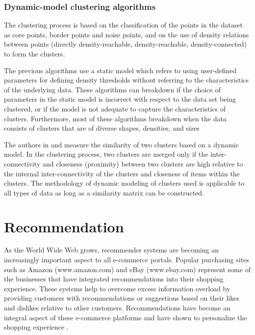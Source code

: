 \subsubsection{Dynamic-model clustering algorithms}
The clustering process is based on the classification of the points in the dataset as  core 
points,  border points and  noise points, and on the use of density relations between points 
(directly density-reachable,  density-reachable,  density-connected) to form the 
clusters. 

The previous algorithms use a static model which refers to using user-defined parameters for defining density thresholds without referring to the characteristics of the underlying data. These algorithms can breakdown if the choice of parameters in the static model is incorrect with respect to the data set being clustered, or if the model is not adequate to capture the characteristics of clusters. Furthermore, most of these
algorithms breakdown when the data consists of clusters that are of diverse shapes, densities, and sizes

The authors in \citep{clustering_14} and \cite{Mitosis_1} measure the similarity of two clusters based on
a dynamic model. In the clustering process, two clusters are merged only if the inter-connectivity and closeness
(proximity) between two clusters are high relative to the internal inter-connectivity of the clusters and closeness of
items within the clusters. The methodology of dynamic modeling of clusters used is applicable to all types of data as long as a similarity matrix can be constructed.

\section{Recommendation}
As the World Wide Web grows, recommender systems are becoming an increasingly important aspect to all e-commerce portals. Popular purchasing sites such as Amazon (www.amazon.com) and eBay (www.ebay.com) represent some of the businesses that have integrated recommendations into their shopping experience. These systems help to overcome excess information overload by providing customers with recommendations or suggestions based on their likes and dislikes relative to other customers.
Recommendations have become an integral aspect of these e-commerce platforms and have shown to personalize the shopping experience \citep{literature_3}.
